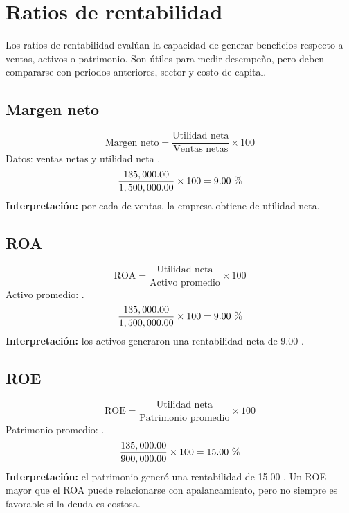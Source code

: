 \section{Ratios de rentabilidad}
Los ratios de rentabilidad evalúan la capacidad de generar beneficios respecto a ventas, activos o patrimonio. Son útiles para medir desempeño, pero deben compararse con periodos anteriores, sector y costo de capital.

\subsection{Margen neto}
\[
\text{Margen neto}=\frac{\text{Utilidad neta}}{\text{Ventas netas}}\times 100
\]
Datos: ventas netas  y utilidad neta .
\[
\frac{135,000.00}{1,500,000.00}\times 100=9.00\text{ \char37}
\]
\textbf{Interpretación:} por cada  de ventas, la empresa obtiene  de utilidad neta.

\newpage
\subsection{ROA}
\[
\text{ROA}=\frac{\text{Utilidad neta}}{\text{Activo promedio}}\times 100
\]
Activo promedio: .
\[
\frac{135,000.00}{1,500,000.00}\times 100=9.00\text{ \char37}
\]
\textbf{Interpretación:} los activos generaron una rentabilidad neta de 9.00 .

\newpage
\subsection{ROE}
\[
\text{ROE}=\frac{\text{Utilidad neta}}{\text{Patrimonio promedio}}\times 100
\]
Patrimonio promedio: .
\[
\frac{135,000.00}{900,000.00}\times 100=15.00\text{ \char37}
\]
\textbf{Interpretación:} el patrimonio generó una rentabilidad de 15.00 . Un ROE mayor que el ROA puede relacionarse con apalancamiento, pero no siempre es favorable si la deuda es costosa.
